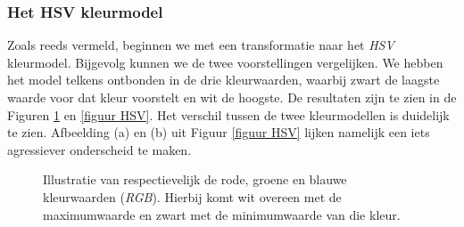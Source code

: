 \documentclass[a4paper,kulak]{kulakarticle}
\begin{document}
\subsubsection{Het HSV kleurmodel}
Zoals reeds vermeld, beginnen we met een transformatie naar het \textit{HSV} kleurmodel. Bijgevolg kunnen we de twee voorstellingen vergelijken. We hebben het model telkens ontbonden in de drie kleurwaarden, waarbij zwart de laagste waarde voor dat kleur voorstelt en wit de hoogste. De resultaten zijn te zien in de Figuren \ref{figuur RGB} en \ref{figuur HSV}. Het verschil tussen de twee kleurmodellen is duidelijk te zien. Afbeelding (a) en (b) uit Figuur \ref{figuur HSV} lijken namelijk een iets agressiever onderscheid te maken.

\begin{figure}[H]
	\centering
	\qquad
	\qquad
	\caption{Illustratie van respectievelijk de rode, groene en blauwe kleurwaarden (\textit{RGB}). Hierbij komt wit overeen met de maximumwaarde en zwart met de minimumwaarde van die kleur.}
	\label{figuur RGB}
\end{figure}
\end{document}
